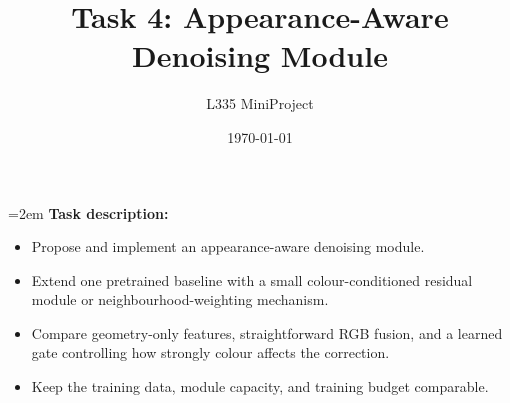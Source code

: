 \documentclass[11pt,a4paper]{article}
\title{Task 4: Appearance-Aware Denoising Module}
\author{L335 MiniProject}
\date{\today}
\makeatletter
\renewcommand{\maketitle}{%
  \noindent{\LARGE \@title\par}\vspace{0.6em}
  \noindent{\large \@author\hfill\@date\par}\vspace{3em}}
\makeatother
\begin{document}
\maketitle

\emergencystretch=2em%
\noindent\textbf{Task description:}
\begin{itemize}[label=--, leftmargin=2.5em, rightmargin=2.5em, labelindent=1em, labelwidth=1em, labelsep=0.5em, align=left, topsep=0pt, partopsep=0pt, itemsep=0pt, parsep=0pt]
\item Propose and implement an appearance-aware denoising module.
\item Extend one pretrained baseline with a small colour-conditioned residual module or neighbourhood-weighting mechanism.
\item Compare geometry-only features, straightforward RGB fusion, and a learned gate controlling how strongly colour affects the correction.
\item Keep the training data, module capacity, and training budget comparable.
\end{itemize}
\vspace{1.3em}%
\end{document}
